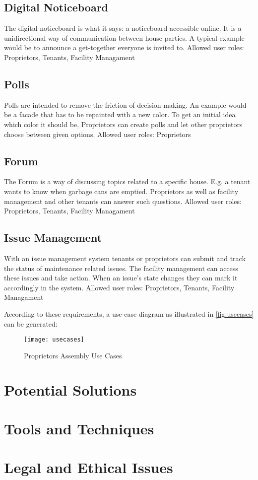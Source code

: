 \subsection{Digital Noticeboard}
The digital noticeboard is what it says: a noticeboard accessible online. It is a unidirectional way of communication between house parties. A typical example would be to announce a get-together everyone is invited to. \newline
Allowed user roles: Proprietors, Tenants, Facility Managament

\subsection{Polls}
Polls are intended to remove the friction of decision-making. An example would be a facade that has to be repainted with a new color. To get an initial idea which color it should be, Proprietors can create polls and let other proprietors choose between given options. \newline
Allowed user roles: Proprietors

\subsection{Forum}
The Forum is a way of discussing topics related to a specific house. E.g. a tenant wants to know when garbage cans are emptied. Proprietors as well as facility management and other tenants can answer such questions. \newline
Allowed user roles: Proprietors, Tenants, Facility Managament

\subsection{Issue Management}
With an issue management system tenants or proprietors can submit and track the status of maintenance related issues. The facility management can access these issues and take action. When an issue's state changes they can mark it accordingly in the system. \newline
Allowed user roles: Proprietors, Tenants, Facility Managament

According to these requirements, a use-case diagram as illustrated in \autoref{fig:usecases} can be generated:
\begin{figure}[!hb]
    \begin{center}
    \texttt{[image: usecases]}
    \end{center}
    \caption{Proprietors Assembly Use Cases}
    \label{fig:usecases}
\end{figure}

\section{Potential Solutions}



\section{Tools and Techniques}

\section{Legal and Ethical Issues}